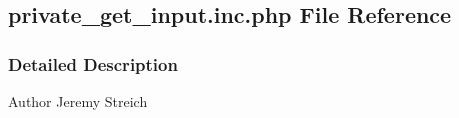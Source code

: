 \hypertarget{private__get__input_8inc_8php}{\subsection{private\-\_\-get\-\_\-input.\-inc.\-php File Reference}
\label{private__get__input_8inc_8php}
}


\subsubsection{Detailed Description}
\begin{DoxyAuthor}{Author}
Jeremy Streich 
\end{DoxyAuthor}
